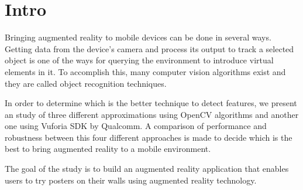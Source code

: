 \chapter{Intro}

Bringing augmented reality to mobile devices can be done in several ways. Getting
data from the device's camera and process its output to track a selected object is
one of the ways for querying the environment to introduce virtual elements in it. To
accomplish this, many computer vision algorithms exist and they are called object
recognition techniques.  

In order to determine which is the better technique to detect features, we present
an study of three different approximations using OpenCV algorithms and another one
using Vuforia SDK by Qualcomm\textregistered. A comparison of performance and
robustness between this four different approaches is made to decide which is the
best to bring augmented reality to a mobile environment.

The goal of the study is to build an augmented reality application that enables 
users to try posters on their walls using augmented reality technology.
